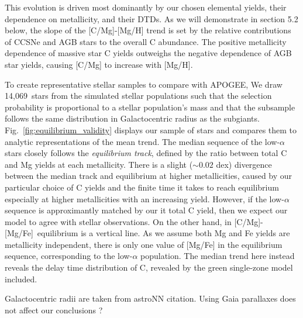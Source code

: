 \documentclass[fleqn,
usenatbib]{mnras}
\newcommand{\nsubgiants}{14,069}
\newcommand{\caafe}{[C/Mg]-[Mg/Fe]}
\newcommand{\dbadd}[1]{{\color{Thistle} #1}}
\begin{document}
This evolution is driven most dominantly by our chosen elemental yields, their
dependence on metallicity, and their DTDs.
As we will demonstrate in section 5.2 below, the slope of the [C/Mg]-[Mg/H] trend is
set by the relative contributions of CCSNe and AGB stars to the overall C abundance.
The positive metallicity dependence of massive star C yields outweighs the negative
dependence of AGB star yields, causing [C/Mg] to increase with [Mg/H].


To create representative stellar samples to compare with APOGEE, 
We draw \nsubgiants\ stars from the simulated stellar populations such that the selection probability is proportional to a stellar population's mass and that the subsample follows the same distribution in Galactocentric radius as the subgiants. 
Fig.~\ref{fig:equilibrium_validity} displays our sample of stars and compares them to analytic representations of the mean trend. 
The median sequence of the low-$\alpha$ stars closely follows the {\it equilibrium track}, defined by the ratio between total C and Mg yields at each metallicity. There is a slight ($\sim{0.02}$ dex) divergence between the median track and equilibrium at higher metallicities, caused by our particular choice of C yields and the finite time it takes to reach equilibrium especially at higher metallicities with an increasing yield. However, if the low-$\alpha$ sequence is approximantly matched by our {it total} C yield, then we expect our model to agree with stellar observations.
On the other hand, in \caafe\ equilibrium is a vertical line. As we assume both Mg and Fe yields are metallicity independent, there is only one value of [Mg/Fe] in the equilibrium sequence, corresponding to the low-$\alpha$ population. The median trend here instead reveals the delay time distribution of C, revealed by the green single-zone model included. 

Galactocentric radii are taken from astroNN {\color{red} citation}. \dbadd{Using Gaia parallaxes does not affect our conclusions ?}
\end{document}
